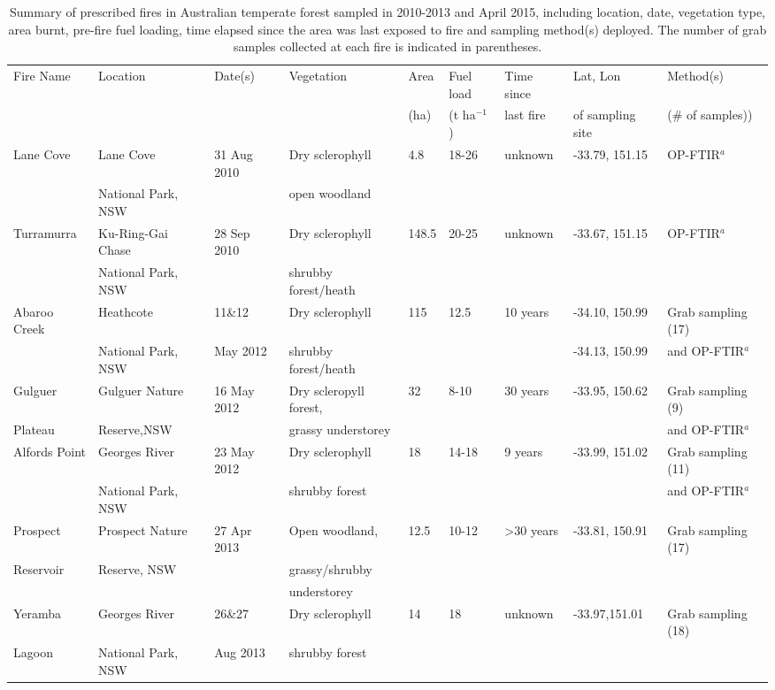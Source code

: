 \documentclass[acp, manuscript]{copernicus}
\begin{document}
\begin{sidewaystable}
\caption{Summary of prescribed fires in Australian temperate forest sampled in 2010-2013 and April 2015, including location, date, vegetation type, area burnt, pre-fire fuel loading, time elapsed since the area was last exposed to fire and sampling method(s) deployed. The number of grab samples collected at each fire is indicated in parentheses.}
\centering
 \begin{tabular}{l l l l  l l l l l }
    \tophline
 Fire Name & Location & Date(s) & Vegetation & Area & Fuel load & Time since & Lat, Lon & Method(s) \\
 & & & &(ha) &(t ha$^{-1}$)&last fire&of sampling site&(\# of samples)) \\
 \hline
 Lane Cove &Lane Cove &31 Aug 2010&Dry sclerophyll&4.8&18-26&unknown&-33.79, 151.15&OP-FTIR$^a$\\
 &National Park, NSW&&open woodland&&&&&\\
 Turramurra &Ku-Ring-Gai Chase &28 Sep 2010&Dry sclerophyll&148.5&20-25&unknown&-33.67, 151.15&OP-FTIR$^a$\\
 &National Park, NSW&&shrubby forest/heath&&&&&\\
 Abaroo Creek&Heathcote &11\&12&Dry sclerophyll&115&12.5&10 years&-34.10, 150.99& Grab sampling (17)\\
 &National Park, NSW&May 2012&shrubby forest/heath&&&&-34.13, 150.99&and OP-FTIR$^a$\\
 Gulguer &Gulguer Nature &16 May 2012&Dry scleropyll forest,&32&8-10&30 years&-33.95, 150.62&Grab sampling (9)\\
 Plateau &Reserve,NSW&&grassy understorey&&&&&and OP-FTIR$^a$\\
 Alfords Point&Georges River &23 May 2012&Dry sclerophyll&18&14-18&9 years&-33.99, 151.02& Grab sampling (11)\\
 &National Park, NSW&&shrubby forest&&&&&and OP-FTIR$^a$\\
 Prospect &Prospect Nature&27 Apr 2013&Open woodland,&12.5&10-12&>30 years&-33.81, 150.91&Grab sampling (17)\\
 Reservoir& Reserve, NSW&&grassy/shrubby&&&&&\\
 &&&understorey&&&&&\\
 Yeramba &Georges River &26\&27 &Dry sclerophyll&14&18&unknown&-33.97,151.01&Grab sampling (18)\\
 Lagoon&National Park, NSW&Aug 2013&shrubby forest&&&&&\\

\end{tabular}
\end{sidewaystable}
\end{document}
